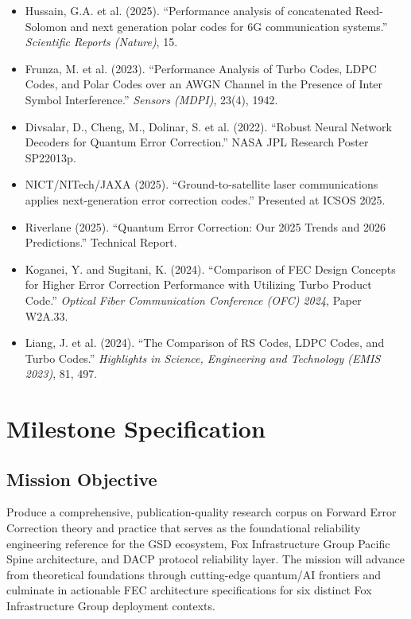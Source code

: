 \documentclass[11pt,letterpaper]{article}
\newcommand{\stageheader}[2]{%
  \noindent\colorbox{#2}{\makebox[\textwidth][l]{%
    \textcolor{white}{\bfseries\sffamily\hspace{6pt}#1\hspace{6pt}}}}%
  \vspace{0.5em}\par%
}
\begin{document}
\begin{itemize}[leftmargin=*]
  \item Hussain, G.A. et al. (2025). ``Performance analysis of concatenated Reed-Solomon and next generation polar codes for 6G communication systems.'' \textit{Scientific Reports (Nature)}, 15.
  \item Frunza, M. et al. (2023). ``Performance Analysis of Turbo Codes, LDPC Codes, and Polar Codes over an AWGN Channel in the Presence of Inter Symbol Interference.'' \textit{Sensors (MDPI)}, 23(4), 1942.
  \item Divsalar, D., Cheng, M., Dolinar, S. et al. (2022). ``Robust Neural Network Decoders for Quantum Error Correction.'' NASA JPL Research Poster SP22013p.
  \item NICT/NITech/JAXA (2025). ``Ground-to-satellite laser communications applies next-generation error correction codes.'' Presented at ICSOS 2025.
  \item Riverlane (2025). ``Quantum Error Correction: Our 2025 Trends and 2026 Predictions.'' Technical Report.
  \item Koganei, Y. and Sugitani, K. (2024). ``Comparison of FEC Design Concepts for Higher Error Correction Performance with Utilizing Turbo Product Code.'' \textit{Optical Fiber Communication Conference (OFC) 2024}, Paper W2A.33.
  \item Liang, J. et al. (2024). ``The Comparison of RS Codes, LDPC Codes, and Turbo Codes.'' \textit{Highlights in Science, Engineering and Technology (EMIS 2023)}, 81, 497.
\end{itemize}

\newpage

\stageheader{STAGE 3 --- MISSION PACKAGE}{tertiary}

\section{Milestone Specification}

\subsection{Mission Objective}

Produce a comprehensive, publication-quality research corpus on Forward Error Correction theory and practice that serves as the foundational reliability engineering reference for the GSD ecosystem, Fox Infrastructure Group Pacific Spine architecture, and DACP protocol reliability layer. The mission will advance from theoretical foundations through cutting-edge quantum/AI frontiers and culminate in actionable FEC architecture specifications for six distinct Fox Infrastructure Group deployment contexts.
\end{document}
